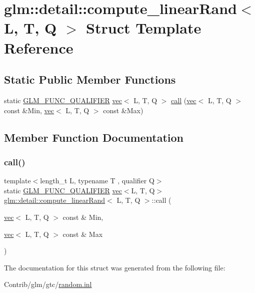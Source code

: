 \hypertarget{structglm_1_1detail_1_1compute__linear_rand}{}\section{glm\+:\+:detail\+:\+:compute\+\_\+linear\+Rand$<$ L, T, Q $>$ Struct Template Reference}
\label{structglm_1_1detail_1_1compute__linear_rand}
\subsection*{Static Public Member Functions}
\begin{DoxyCompactItemize}
\item 
static \mbox{\hyperlink{setup_8hpp_a33fdea6f91c5f834105f7415e2a64407}{G\+L\+M\+\_\+\+F\+U\+N\+C\+\_\+\+Q\+U\+A\+L\+I\+F\+I\+ER}} \mbox{\hyperlink{structglm_1_1vec}{vec}}$<$ L, T, Q $>$ \mbox{\hyperlink{structglm_1_1detail_1_1compute__linear_rand_a96fb666d7c6fc741f77a6c119d8367d1}{call}} (\mbox{\hyperlink{structglm_1_1vec}{vec}}$<$ L, T, Q $>$ const \&Min, \mbox{\hyperlink{structglm_1_1vec}{vec}}$<$ L, T, Q $>$ const \&Max)
\end{DoxyCompactItemize}


\subsection{Member Function Documentation}
\mbox{\label{structglm_1_1detail_1_1compute__linear_rand_a96fb666d7c6fc741f77a6c119d8367d1}} 
\subsubsection{\texorpdfstring{call()}{call()}}
{\footnotesize\ttfamily template$<$length\+\_\+t L, typename T , qualifier Q$>$ \\
static \mbox{\hyperlink{setup_8hpp_a33fdea6f91c5f834105f7415e2a64407}{G\+L\+M\+\_\+\+F\+U\+N\+C\+\_\+\+Q\+U\+A\+L\+I\+F\+I\+ER}} \mbox{\hyperlink{structglm_1_1vec}{vec}}$<$L, T, Q$>$ \mbox{\hyperlink{structglm_1_1detail_1_1compute__linear_rand}{glm\+::detail\+::compute\+\_\+linear\+Rand}}$<$ L, T, Q $>$\+::call (\begin{DoxyParamCaption}\item[{\mbox{\hyperlink{structglm_1_1vec}{vec}}$<$ L, T, Q $>$ const \&}]{Min,  }\item[{\mbox{\hyperlink{structglm_1_1vec}{vec}}$<$ L, T, Q $>$ const \&}]{Max }\end{DoxyParamCaption})\hspace{0.3cm}{\ttfamily [static]}}



The documentation for this struct was generated from the following file\+:\begin{DoxyCompactItemize}
\item 
Contrib/glm/gtc/\mbox{\hyperlink{random_8inl}{random.\+inl}}\end{DoxyCompactItemize}
